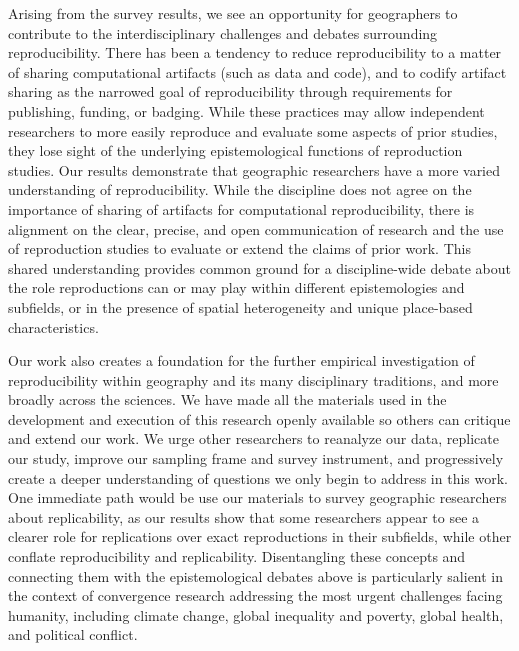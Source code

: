 \documentclass[]{interact}
\theoremstyle{plain}%
\theoremstyle{definition}
\theoremstyle{remark}
\begin{document}
Arising from the survey results, we see an opportunity for geographers to contribute to the interdisciplinary challenges and debates surrounding reproducibility.
There has been a tendency to reduce reproducibility to a matter of sharing computational artifacts (such as data and code), and to codify artifact sharing as the narrowed goal of reproducibility through requirements for publishing, funding, or badging.
While these practices may allow independent researchers to more easily reproduce and evaluate some aspects of prior studies, they lose sight of the underlying epistemological functions of reproduction studies.
Our results demonstrate that geographic researchers have a more varied understanding of reproducibility. 
While the discipline does not agree on the importance of sharing of artifacts for computational reproducibility, there is alignment on the clear, precise, and open communication of research and the use of reproduction studies to evaluate or extend the claims of prior work.
This shared understanding provides common ground for a discipline-wide debate about the role reproductions can or may play within different epistemologies and subfields, or in the presence of spatial heterogeneity and unique place-based characteristics. 

Our work also creates a foundation for the further empirical investigation of reproducibility within geography and its many disciplinary traditions, and more broadly across the sciences. 
We have made all the materials used in the development and execution of this research openly available so others can critique and extend our work.
We urge other researchers to reanalyze our data, replicate our study, improve our sampling frame and survey instrument, and progressively create a deeper understanding of questions we only begin to address in this work. 
One immediate path would be use our materials to survey geographic researchers about replicability, as our results show that some researchers appear to see a clearer role for replications over exact reproductions in their subfields, while other conflate reproducibility and replicability.
Disentangling these concepts and connecting them with the epistemological debates above is particularly salient in the context of convergence research addressing the most urgent challenges facing humanity, including climate change, global inequality and poverty, global health, and political conflict.


\theendnotes


\end{document}
